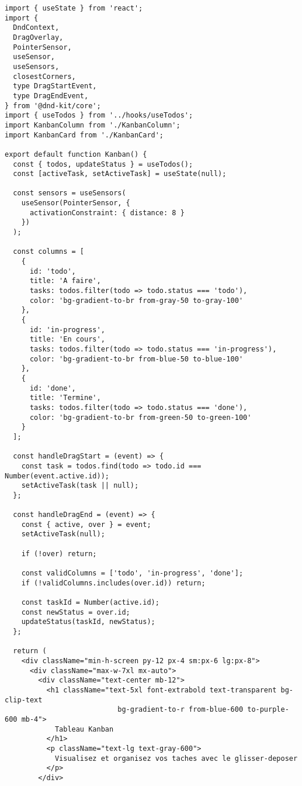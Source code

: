 \documentclass[12pt,a4paper]{article}
\begin{document}
\begin{lstlisting}[caption=Kanban.tsx - Tableau Kanban avec drag-and-drop (Tomas)]
import { useState } from 'react';
import {
  DndContext,
  DragOverlay,
  PointerSensor,
  useSensor,
  useSensors,
  closestCorners,
  type DragStartEvent,
  type DragEndEvent,
} from '@dnd-kit/core';
import { useTodos } from '../hooks/useTodos';
import KanbanColumn from './KanbanColumn';
import KanbanCard from './KanbanCard';

export default function Kanban() {
  const { todos, updateStatus } = useTodos();
  const [activeTask, setActiveTask] = useState(null);

  const sensors = useSensors(
    useSensor(PointerSensor, {
      activationConstraint: { distance: 8 }
    })
  );

  const columns = [
    { 
      id: 'todo', 
      title: 'A faire', 
      tasks: todos.filter(todo => todo.status === 'todo'),
      color: 'bg-gradient-to-br from-gray-50 to-gray-100'
    },
    { 
      id: 'in-progress', 
      title: 'En cours', 
      tasks: todos.filter(todo => todo.status === 'in-progress'),
      color: 'bg-gradient-to-br from-blue-50 to-blue-100'
    },
    { 
      id: 'done', 
      title: 'Termine', 
      tasks: todos.filter(todo => todo.status === 'done'),
      color: 'bg-gradient-to-br from-green-50 to-green-100'
    }
  ];

  const handleDragStart = (event) => {
    const task = todos.find(todo => todo.id === Number(event.active.id));
    setActiveTask(task || null);
  };

  const handleDragEnd = (event) => {
    const { active, over } = event;
    setActiveTask(null);
    
    if (!over) return;

    const validColumns = ['todo', 'in-progress', 'done'];
    if (!validColumns.includes(over.id)) return;

    const taskId = Number(active.id);
    const newStatus = over.id;
    updateStatus(taskId, newStatus);
  };

  return (
    <div className="min-h-screen py-12 px-4 sm:px-6 lg:px-8">
      <div className="max-w-7xl mx-auto">
        <div className="text-center mb-12">
          <h1 className="text-5xl font-extrabold text-transparent bg-clip-text 
                           bg-gradient-to-r from-blue-600 to-purple-600 mb-4">
            Tableau Kanban
          </h1>
          <p className="text-lg text-gray-600">
            Visualisez et organisez vos taches avec le glisser-deposer
          </p>
        </div>


\end{lstlisting}
\end{document}
